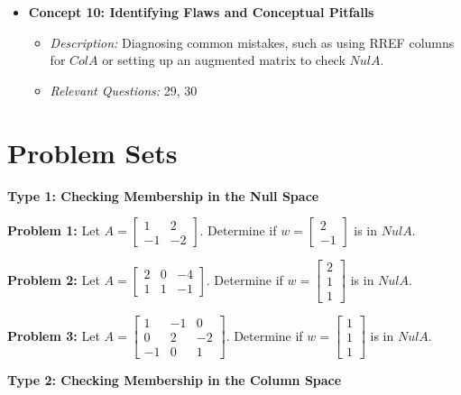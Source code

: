 \documentclass[11pt]{article}
\begin{document}
\begin{itemize}
    \item \textbf{Concept 10: Identifying Flaws and Conceptual Pitfalls}
    \begin{itemize}
        \item \textit{Description:} Diagnosing common mistakes, such as using RREF columns for $Col A$ or setting up an augmented matrix to check $Nul A$.
        \item \textit{Relevant Questions:} 29, 30
    \end{itemize}
\end{itemize}

\newpage

\section{Problem Sets}

\textbf{Type 1: Checking Membership in the Null Space}

\noindent \textbf{Problem 1:} Let $A = \begin{bmatrix} 1 & 2 \\ -1 & -2 \end{bmatrix}$. Determine if $w = \begin{bmatrix} 2 \\ -1 \end{bmatrix}$ is in $Nul A$.

\noindent \textbf{Problem 2:} Let $A = \begin{bmatrix} 2 & 0 & -4 \\ 1 & 1 & -1 \end{bmatrix}$. Determine if $w = \begin{bmatrix} 2 \\ 1 \\ 1 \end{bmatrix}$ is in $Nul A$.

\noindent \textbf{Problem 3:} Let $A = \begin{bmatrix} 1 & -1 & 0 \\ 0 & 2 & -2 \\ -1 & 0 & 1 \end{bmatrix}$. Determine if $w = \begin{bmatrix} 1 \\ 1 \\ 1 \end{bmatrix}$ is in $Nul A$.

\vspace{0.5cm}
\noindent \textbf{Type 2: Checking Membership in the Column Space}
\end{document}
